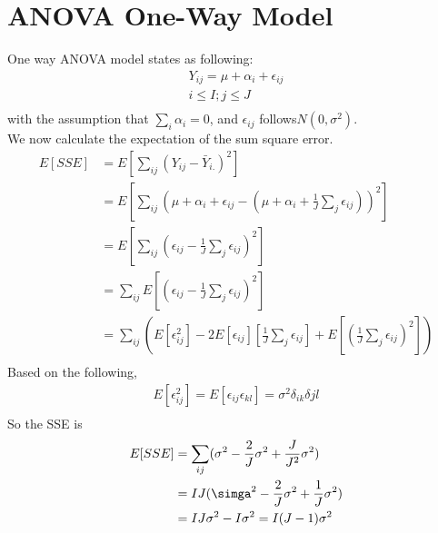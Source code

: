 \documentclass[a4paper]{article}
\begin{document}
\section{ANOVA One-Way Model}
One way ANOVA model states as following:\\
\begin{align*}
	Y_{ij} = \mu + \alpha_i + \epsilon_{ij}\\
	i \leq I; j \leq J \\
\end{align*}
with the assumption that $\sum_i \alpha_i = 0$, and $\epsilon_{ij}$ follows$N(0, \sigma^2)$.\\
We now calculate the expectation of the sum square error.\\
\begin{align*}
	E[SSE] & = E[\sum_{ij} (Y_{ij} - \bar Y_{i.})^2] \\
	       & = E[\sum_{ij} (\mu + \alpha_i + \epsilon_{ij}
	       -(\mu + \alpha_i + \frac{1}{J}\sum_j \epsilon_{ij}))^2]\\
	       & = E[\sum_{ij}(\epsilon_{ij} -\frac{1}{J}\sum_{j} \epsilon_{ij})^2] \\
	       & = \sum_{ij} E[(\epsilon_{ij} - \frac{1}{J}\sum_{j} \epsilon_{ij})^2]\\
	       & = \sum_{ij}(E[\epsilon^2_{ij}] - 2E[\epsilon_{ij}][\frac{1}{J}\sum_j \epsilon_{ij}]+
	       E[(\frac{1}{J}\sum_j \epsilon_{ij})^2])\\
\end{align*}
Based on the following,\\
\begin{align*}
	E[\epsilon^2_{ij}] = E[\epsilon_{ij} \epsilon_{kl}] = \sigma^2 \delta_{ik} \delta{jl}\\
\end{align*}
So the SSE is\\
\begin{align*}
	E[SSE] & = \sum_{ij} (\sigma^2 -\frac{2}{J} \sigma^2 +\frac{J}{J^2}\sigma^2)\\
	       & = IJ(\simga^2 - \frac{2}{J} \sigma^2 + \frac{1}{J} \sigma^2) \\
	       & = IJ\sigma^2 - I \sigma^2 = I(J-1) \sigma^2\\
\end{align*}
\end{document}
